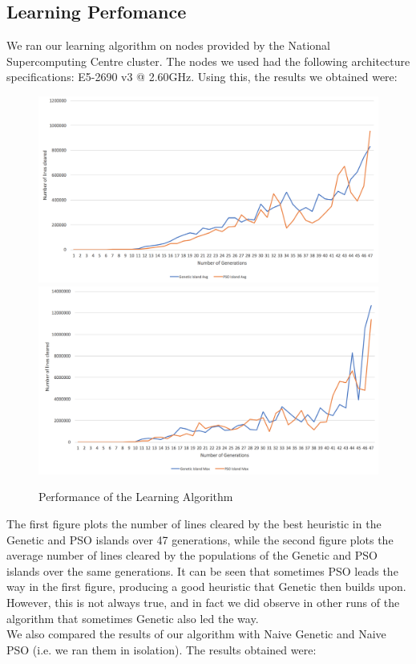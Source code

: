 \documentclass[12pt]{article}
\begin{document}
	\subsection{Learning Perfomance}
	We ran our learning algorithm on nodes provided by the National Supercomputing Centre cluster.
	The nodes we used had the following architecture specifications: E5-2690 v3 @ 2.60GHz.
	Using this, the results we obtained were:

	\begin{figure}[h]
		\includegraphics[scale=0.28]{learning/AlgoMax}
		\includegraphics[scale=0.28]{learning/AlgoAvg}
		\centering
		\caption{Performance of the Learning Algorithm}
		\label{fig:learning}
	\end{figure}

	The first figure plots the number of lines cleared by the best heuristic in
	the Genetic and PSO islands over 47 generations, while the second figure plots
	the average number of lines cleared by the populations of the Genetic and PSO
	islands over the same generations. It can be seen that sometimes PSO leads the
	way in the first figure, producing a good heuristic that Genetic then builds
	upon. However, this is not always true, and in fact we did observe in other
	runs of the algorithm that sometimes Genetic also led the way.\\
	We also compared the results of our algorithm with Naive Genetic and Naive PSO
	(i.e. we ran them in isolation). The results obtained were:
\end{document}
